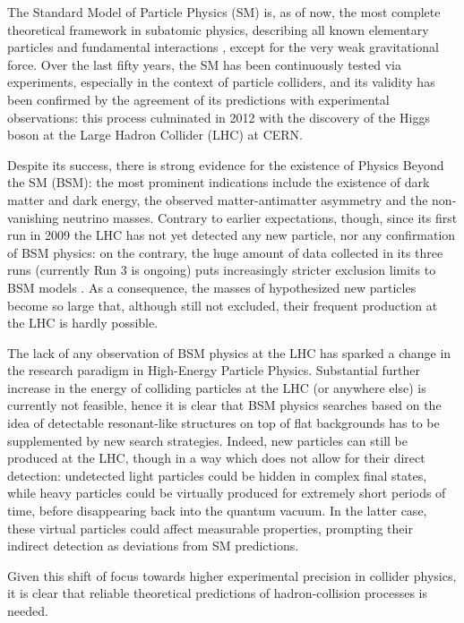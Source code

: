 
The Standard Model of Particle Physics (SM) is, as of now, the most complete theoretical framework in subatomic physics, describing all known elementary particles and fundamental interactions \cite{Glashow-1961, Salam-1964, Weinberg-1967, Fritzsch-1972, Fritzsch-1973, Higgs-1964-1, Higgs-1964-2, Englert-1964, Guralnik-1964}, except for the very weak gravitational force. Over the last fifty years, the SM has been continuously tested via experiments, especially in the context of particle colliders, and its validity has been confirmed by the agreement of its predictions with experimental observations: this process culminated in 2012 with the discovery of the Higgs boson \cite{ATLAS-2012, CMS-2012} at the Large Hadron Collider (LHC) at CERN.

Despite its success, there is strong evidence for the existence of Physics Beyond the SM (BSM): the most prominent indications include the existence of dark matter and dark energy, the observed matter-antimatter asymmetry and the non-vanishing neutrino masses. Contrary to earlier expectations, though, since its first run in 2009 the LHC has not yet detected any new particle, nor any confirmation of BSM physics: on the contrary, the huge amount of data collected in its three runs (currently Run 3 is ongoing) puts increasingly stricter exclusion limits to BSM models \cite{CMS-ATLAS-SUSY, Bsekidt-2012, Ghosh-2025, Crivellin-2015}. As a consequence, the masses of hypothesized new particles become so large that, although still not excluded, their frequent production at the LHC is hardly possible.

The lack of any observation of BSM physics at the LHC has sparked a change in the research paradigm in High-Energy Particle Physics. Substantial further increase in the energy of colliding particles at the LHC (or anywhere else) is currently not feasible, hence it is clear that BSM physics searches based on the idea of detectable resonant-like structures on top of flat backgrounds has to be supplemented by new search strategies. Indeed, new particles can still be produced at the LHC, though in a way which does not allow for their direct detection: undetected light particles could be hidden in complex final states, while heavy particles could be virtually produced for extremely short periods of time, before disappearing back into the quantum vacuum. In the latter case, these virtual particles could affect measurable properties, prompting their indirect detection as deviations from SM predictions.

Given this shift of focus towards higher experimental precision in collider physics, it is clear that reliable theoretical predictions of hadron-collision processes is needed.
